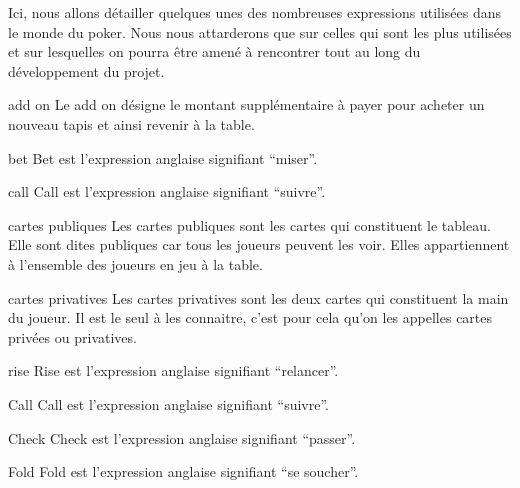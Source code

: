 
Ici, nous allons détailler quelques unes des nombreuses expressions utilisées dans le monde du poker. Nous nous attarderons que sur celles qui sont les plus utilisées et sur lesquelles on pourra être amené à rencontrer tout au long du développement du projet.\\

\begin{df}{add on}
		Le add on désigne le montant supplémentaire à payer pour acheter un nouveau tapis et ainsi revenir à la table.
\end{df}

\begin{df}{bet}
	Bet est l'expression anglaise signifiant ``miser''.
\end{df}

\begin{df}{call}
	Call est l'expression anglaise signifiant ``suivre''.
\end{df}

\begin{df}{cartes publiques}
	Les cartes publiques sont les cartes qui constituent le tableau. Elle sont dites publiques car tous les joueurs peuvent les voir. Elles appartiennent à l'ensemble des joueurs en jeu à la table.	
\end{df}


\begin{df}{cartes privatives}
	Les cartes privatives sont les deux cartes qui constituent la main du joueur. Il est le seul à les connaitre, c'est pour cela qu'on les appelles cartes privées ou privatives.
\end{df}

\begin{df}{rise}
	Rise est l'expression anglaise signifiant ``relancer''.
\end{df}

\begin{df}{Call}
	Call est l'expression anglaise signifiant ``suivre''.
\end{df}

\begin{df}{Check}
	Check est l'expression anglaise signifiant ``passer''.
\end{df}

\begin{df}{Fold}
	Fold est l'expression anglaise signifiant ``se soucher''.
\end{df}

